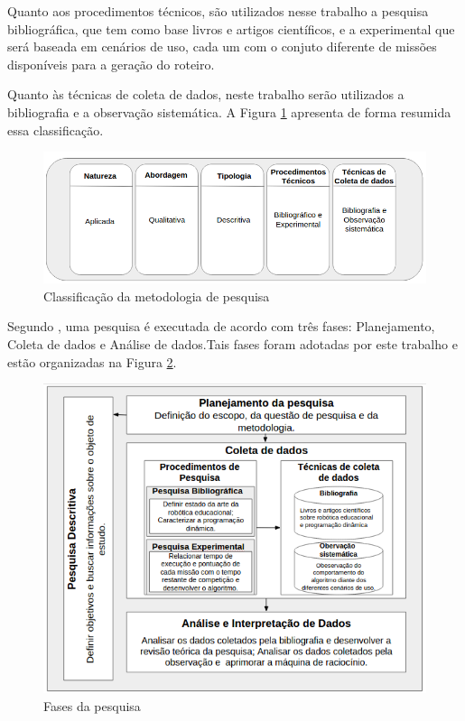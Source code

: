 Quanto aos procedimentos técnicos, são utilizados nesse trabalho a pesquisa bibliográfica, que tem como base livros e artigos científicos, e a experimental que será baseada em cenários de uso, cada um com o conjuto diferente de missões disponíveis para a geração do roteiro.

Quanto às técnicas de coleta de dados, neste trabalho serão utilizados a bibliografia e a observação sistemática. A Figura \ref{metodologiaPesquisa} apresenta de forma resumida essa classificação.


\FloatBarrier
\begin{figure}[!h]
\centering
\includegraphics[keepaspectratio=true,scale=0.5]{figuras/metodologiaPesquisa.png}
\caption{Classificação da metodologia de pesquisa}
\label{metodologiaPesquisa}
\end{figure}

Segundo , uma pesquisa é executada de acordo com três fases: Planejamento, Coleta de dados e Análise de dados.Tais fases foram adotadas por este trabalho e estão organizadas na Figura \ref{fasesPesquisa}.
\clearpage

\FloatBarrier
\begin{figure}[!h]
\centering
\includegraphics[keepaspectratio=true,scale=0.8]{figuras/fasesPesquisa.png}
\caption{Fases da pesquisa}
\label{fasesPesquisa}
\end{figure}

